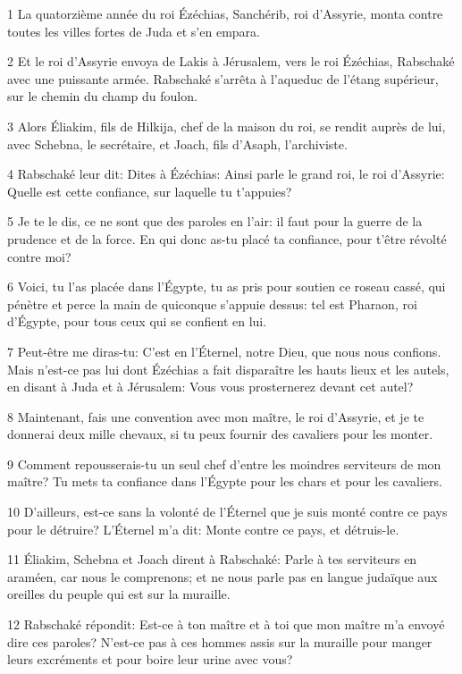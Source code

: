 \par 1 La quatorzième année du roi Ézéchias, Sanchérib, roi d'Assyrie, monta contre toutes les villes fortes de Juda et s'en empara.
\par 2 Et le roi d'Assyrie envoya de Lakis à Jérusalem, vers le roi Ézéchias, Rabschaké avec une puissante armée. Rabschaké s'arrêta à l'aqueduc de l'étang supérieur, sur le chemin du champ du foulon.
\par 3 Alors Éliakim, fils de Hilkija, chef de la maison du roi, se rendit auprès de lui, avec Schebna, le secrétaire, et Joach, fils d'Asaph, l'archiviste.
\par 4 Rabschaké leur dit: Dites à Ézéchias: Ainsi parle le grand roi, le roi d'Assyrie: Quelle est cette confiance, sur laquelle tu t'appuies?
\par 5 Je te le dis, ce ne sont que des paroles en l'air: il faut pour la guerre de la prudence et de la force. En qui donc as-tu placé ta confiance, pour t'être révolté contre moi?
\par 6 Voici, tu l'as placée dans l'Égypte, tu as pris pour soutien ce roseau cassé, qui pénètre et perce la main de quiconque s'appuie dessus: tel est Pharaon, roi d'Égypte, pour tous ceux qui se confient en lui.
\par 7 Peut-être me diras-tu: C'est en l'Éternel, notre Dieu, que nous nous confions. Mais n'est-ce pas lui dont Ézéchias a fait disparaître les hauts lieux et les autels, en disant à Juda et à Jérusalem: Vous vous prosternerez devant cet autel?
\par 8 Maintenant, fais une convention avec mon maître, le roi d'Assyrie, et je te donnerai deux mille chevaux, si tu peux fournir des cavaliers pour les monter.
\par 9 Comment repousserais-tu un seul chef d'entre les moindres serviteurs de mon maître? Tu mets ta confiance dans l'Égypte pour les chars et pour les cavaliers.
\par 10 D'ailleurs, est-ce sans la volonté de l'Éternel que je suis monté contre ce pays pour le détruire? L'Éternel m'a dit: Monte contre ce pays, et détruis-le.
\par 11 Éliakim, Schebna et Joach dirent à Rabschaké: Parle à tes serviteurs en araméen, car nous le comprenons; et ne nous parle pas en langue judaïque aux oreilles du peuple qui est sur la muraille.
\par 12 Rabschaké répondit: Est-ce à ton maître et à toi que mon maître m'a envoyé dire ces paroles? N'est-ce pas à ces hommes assis sur la muraille pour manger leurs excréments et pour boire leur urine avec vous?
